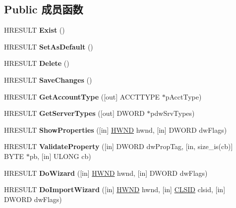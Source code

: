 \subsection*{Public 成员函数}
\begin{DoxyCompactItemize}
\item 
\mbox{\label{interface_i_imn_account_a3181bf7f4106bbdb635604d79d9e90a8}} 
H\+R\+E\+S\+U\+LT {\bfseries Exist} ()
\item 
\mbox{\label{interface_i_imn_account_aa8cfe6bedc90fd20933711dcfc9c9aea}} 
H\+R\+E\+S\+U\+LT {\bfseries Set\+As\+Default} ()
\item 
\mbox{\label{interface_i_imn_account_a12433ca7230540186650e3a993f80ef8}} 
H\+R\+E\+S\+U\+LT {\bfseries Delete} ()
\item 
\mbox{\label{interface_i_imn_account_ac42d5ee916d4339f70cedc344a59097a}} 
H\+R\+E\+S\+U\+LT {\bfseries Save\+Changes} ()
\item 
\mbox{\label{interface_i_imn_account_a5f5bdc75ff85140919ab9b29eabcb784}} 
H\+R\+E\+S\+U\+LT {\bfseries Get\+Account\+Type} (\mbox{[}out\mbox{]} A\+C\+C\+T\+T\+Y\+PE $\ast$p\+Acct\+Type)
\item 
\mbox{\label{interface_i_imn_account_aae22fb8c46ee274fb165133c64973cd0}} 
H\+R\+E\+S\+U\+LT {\bfseries Get\+Server\+Types} (\mbox{[}out\mbox{]} D\+W\+O\+RD $\ast$pdw\+Srv\+Types)
\item 
\mbox{\label{interface_i_imn_account_ac39e50d71201894a9b1d79e259a8776d}} 
H\+R\+E\+S\+U\+LT {\bfseries Show\+Properties} (\mbox{[}in\mbox{]} \hyperlink{interfacevoid}{H\+W\+ND} hwnd, \mbox{[}in\mbox{]} D\+W\+O\+RD dw\+Flags)
\item 
\mbox{\label{interface_i_imn_account_a666c54e24234b8d17027f1f85170b326}} 
H\+R\+E\+S\+U\+LT {\bfseries Validate\+Property} (\mbox{[}in\mbox{]} D\+W\+O\+RD dw\+Prop\+Tag, \mbox{[}in, size\+\_\+is(cb)\mbox{]} B\+Y\+TE $\ast$pb, \mbox{[}in\mbox{]} U\+L\+O\+NG cb)
\item 
\mbox{\label{interface_i_imn_account_a165d0d9cf96a71ffae705f52ef969444}} 
H\+R\+E\+S\+U\+LT {\bfseries Do\+Wizard} (\mbox{[}in\mbox{]} \hyperlink{interfacevoid}{H\+W\+ND} hwnd, \mbox{[}in\mbox{]} D\+W\+O\+RD dw\+Flags)
\item 
\mbox{\label{interface_i_imn_account_ab7b80ca6dda034d383885080e1e6805c}} 
H\+R\+E\+S\+U\+LT {\bfseries Do\+Import\+Wizard} (\mbox{[}in\mbox{]} \hyperlink{interfacevoid}{H\+W\+ND} hwnd, \mbox{[}in\mbox{]} \hyperlink{struct___i_i_d}{C\+L\+S\+ID} clsid, \mbox{[}in\mbox{]} D\+W\+O\+RD dw\+Flags)
\end{DoxyCompactItemize}
